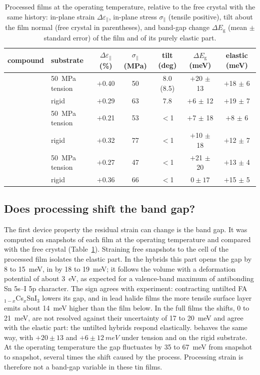 \begin{table}[t]
  \centering\small
  \caption{Processed films at the operating temperature, relative to the free crystal with the same history:
    in-plane strain $\Delta\varepsilon_\parallel$, in-plane stress $\sigma_\parallel$ (tensile positive), tilt about
    the film normal (free crystal in parentheses), and band-gap change $\Delta E_\mathrm{g}$ (mean $\pm$ standard error) of the film and of its
    purely elastic part.}
  \label{tab:wp-film}
  \begin{tabular}{llccccc}
    \toprule
    compound & substrate & $\Delta\varepsilon_\parallel$ (\%) & $\sigma_\parallel$ (MPa) & tilt (deg) &
      $\Delta E_\mathrm{g}$ (meV) & elastic (meV) \\
    \midrule
    \CsSnI{} & \SI{50}{MPa} tension & $+$0.40 & 50 & 8.0 (8.5) & $+$20 $\pm$ 13 & $+$18 $\pm$ 6 \\
     & rigid & $+$0.29 & 63 & 7.8 & $+$6 $\pm$ 12 & $+$19 $\pm$ 7 \\
    \MASnI{} & \SI{50}{MPa} tension & $+$0.21 & 53 & $<$1 & $+$7 $\pm$ 18 & $+$8 $\pm$ 6 \\
     & rigid & $+$0.32 & 77 & $<$1 & $+$10 $\pm$ 18 & $+$12 $\pm$ 7 \\
    \FASnI{} & \SI{50}{MPa} tension & $+$0.27 & 47 & $<$1 & $+$21 $\pm$ 20 & $+$13 $\pm$ 4 \\
     & rigid & $+$0.36 & 66 & $<$1 & $0 \pm 17$ & $+$15 $\pm$ 5 \\
    \bottomrule
  \end{tabular}
\end{table}

\subsection{Does processing shift the band gap?}
\label{sec:wp-gap}
The first device property the residual strain can change is the band gap. It was computed on snapshots of each film at the operating temperature and compared with the free crystal
(Table~\ref{tab:wp-film}). Straining free snapshots to the cell of the processed film isolates the elastic part. In
the hybrids this part opens the gap by 8 to \SI{15}{meV}, in \CsSnI{} by 18 to \SI{19}{meV}; it follows the volume with a deformation potential of about
\SI{3}{eV}, as expected for a valence-band maximum of antibonding Sn 5s--I 5p character.\cite{huang2013electronic} The sign
agrees with experiment: contracting untilted FA$_{1-x}$Cs$_x$SnI$_3$ lowers its gap,\cite{Prasanna2017JACS} and in lead
halide films the more tensile surface layer emits about \SI{14}{meV} higher than the film below.\cite{Zhu2019NatCommun}
In the full films the shifts, 0 to \SI{21}{meV}, are not resolved against their uncertainty of 17 to \SI{20}{meV}
and agree with the elastic part: the untilted hybrids respond elastically. \CsSnI{} behaves the same way, with $+20 \pm 13$ and
$+6 \pm \SI{12}{meV}$ under tension and on the rigid substrate. At the operating temperature the gap fluctuates by 35 to
\SI{67}{meV} from snapshot to snapshot, several times the shift caused by the process. Processing strain is therefore
not a band-gap variable in these tin films.

